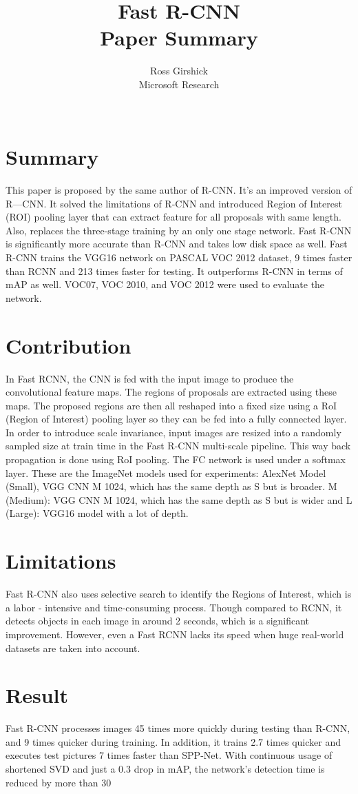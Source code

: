 \documentclass{article}
\title{Fast R-CNN
\large 
\\Paper Summary}
\author{Ross Girshick \\
  \small Microsoft Research
\\\\
}
\date{\vspace{-5ex}}
\begin{document}
\maketitle

\section{Summary}
This paper is proposed by the same author of R-CNN. It’s an improved version of R—CNN. It solved the limitations of R-CNN and introduced Region of Interest (ROI) pooling layer that can extract feature for all proposals with same length. Also, replaces the three-stage training by an only one stage network. Fast R-CNN is significantly more accurate than R-CNN and takes low disk space as well. Fast R-CNN trains the VGG16 network on PASCAL VOC 2012 dataset, 9 times faster than RCNN and 213 times faster for testing. It outperforms R-CNN in terms of mAP as well. VOC07, VOC 2010, and VOC 2012 were used to evaluate the network.

\section{Contribution}
In Fast RCNN, the CNN is fed with the input image to produce the convolutional feature maps. The regions of proposals are extracted using these maps. The proposed regions are then all reshaped into a fixed size using a RoI (Region of Interest) pooling layer so they can be fed into a fully connected layer. In order to introduce scale invariance, input images are resized into a randomly sampled size at train time in the Fast R-CNN multi-scale pipeline. This way back propagation is done using RoI pooling. The FC network is used under a softmax layer. These are the ImageNet models used for experiments: AlexNet Model (Small), VGG CNN M 1024, which has the same depth as S but is broader. M (Medium): VGG CNN M 1024, which has the same depth as S but is wider and L (Large): VGG16 model with a lot of depth. 

\section{Limitations}
Fast R-CNN also uses selective search to identify the Regions of Interest, which is a labor - intensive and time-consuming process. Though compared to RCNN, it detects objects in each image in around 2 seconds, which is a significant improvement. However, even a Fast RCNN lacks its speed when huge real-world datasets are taken into account.

\section{Result}
Fast R-CNN processes images 45 times more quickly during testing than R-CNN, and 9 times quicker during training. In addition, it trains 2.7 times quicker and executes test pictures 7 times faster than SPP-Net. With continuous usage of shortened SVD and just a 0.3 drop in mAP, the network's detection time is reduced by more than 30%
\end{document}
